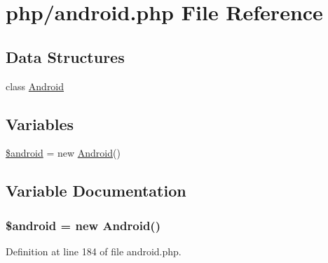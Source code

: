 \hypertarget{php_2android_8php}{}\section{php/android.php File Reference}
\label{php_2android_8php}
\subsection*{Data Structures}
\begin{DoxyCompactItemize}
\item 
class \hyperlink{class_android}{Android}
\end{DoxyCompactItemize}
\subsection*{Variables}
\begin{DoxyCompactItemize}
\item 
\hyperlink{php_2android_8php_a9860cae8b49c1a1acfb83540705701ab}{\$android} = new \hyperlink{class_android}{Android}()
\end{DoxyCompactItemize}


\subsection{Variable Documentation}
\hypertarget{php_2android_8php_a9860cae8b49c1a1acfb83540705701ab}{}
\subsubsection[{\$android}]{\setlength{\rightskip}{0pt plus 5cm}\$android = new {\bf Android}()}\label{php_2android_8php_a9860cae8b49c1a1acfb83540705701ab}


Definition at line 184 of file android.\+php.

